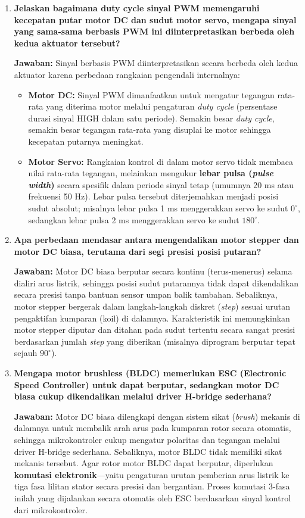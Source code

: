 \begin{enumerate}
    \item \textbf{Jelaskan bagaimana duty cycle sinyal PWM memengaruhi kecepatan putar motor DC dan sudut motor servo, mengapa sinyal yang sama-sama berbasis PWM ini diinterpretasikan berbeda oleh kedua aktuator tersebut?}

    \textbf{Jawaban:} Sinyal berbasis PWM diinterpretasikan secara berbeda oleh kedua aktuator karena perbedaan rangkaian pengendali internalnya:
    \begin{itemize}
        \item \textbf{Motor DC:} Sinyal PWM dimanfaatkan untuk mengatur tegangan rata-rata yang diterima motor melalui pengaturan \textit{duty cycle} (persentase durasi sinyal HIGH dalam satu periode). Semakin besar \textit{duty cycle}, semakin besar tegangan rata-rata yang disuplai ke motor sehingga kecepatan putarnya meningkat.
        \item \textbf{Motor Servo:} Rangkaian kontrol di dalam motor servo tidak membaca nilai rata-rata tegangan, melainkan mengukur \textbf{lebar pulsa (\textit{pulse width})} secara spesifik dalam periode sinyal tetap (umumnya 20 ms atau frekuensi 50 Hz). Lebar pulsa tersebut diterjemahkan menjadi posisi sudut absolut; misalnya lebar pulsa 1 ms menggerakkan servo ke sudut $0^\circ$, sedangkan lebar pulsa 2 ms menggerakkan servo ke sudut $180^\circ$.
    \end{itemize}

    \item \textbf{Apa perbedaan mendasar antara mengendalikan motor stepper dan motor DC biasa, terutama dari segi presisi posisi putaran?}

    \textbf{Jawaban:} Motor DC biasa berputar secara kontinu (terus-menerus) selama dialiri arus listrik, sehingga posisi sudut putarannya tidak dapat dikendalikan secara presisi tanpa bantuan sensor umpan balik tambahan. Sebaliknya, motor stepper bergerak dalam langkah-langkah diskret (\textit{step}) sesuai urutan pengaktifan kumparan (koil) di dalamnya. Karakteristik ini memungkinkan motor stepper diputar dan ditahan pada sudut tertentu secara sangat presisi berdasarkan jumlah \textit{step} yang diberikan (misalnya diprogram berputar tepat sejauh $90^\circ$).

    \item \textbf{Mengapa motor brushless (BLDC) memerlukan ESC (Electronic Speed Controller) untuk dapat berputar, sedangkan motor DC biasa cukup dikendalikan melalui driver H-bridge sederhana?}

    \textbf{Jawaban:} Motor DC biasa dilengkapi dengan sistem sikat (\textit{brush}) mekanis di dalamnya untuk membalik arah arus pada kumparan rotor secara otomatis, sehingga mikrokontroler cukup mengatur polaritas dan tegangan melalui driver H-bridge sederhana. Sebaliknya, motor BLDC tidak memiliki sikat mekanis tersebut. Agar rotor motor BLDC dapat berputar, diperlukan \textbf{komutasi elektronik}---yaitu pengaturan urutan pemberian arus listrik ke tiga fasa lilitan stator secara presisi dan bergantian. Proses komutasi 3-fasa inilah yang dijalankan secara otomatis oleh ESC berdasarkan sinyal kontrol dari mikrokontroler.
\end{enumerate}